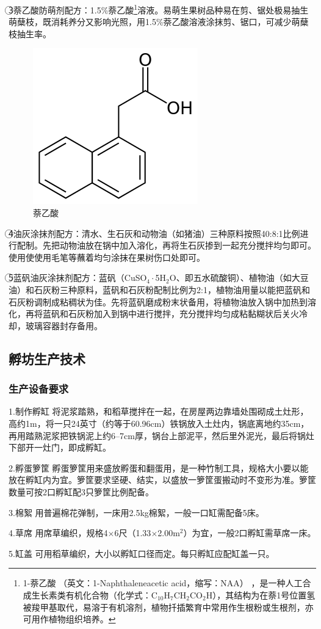 \documentclass{ctexbook}
\begin{document}
\textcircled{3}萘乙酸防萌剂配方：1.5\%萘乙酸\footnote{1-萘乙酸 （英文：1-Naphthaleneacetic acid，缩写：NAA） ，是一种人工合成生长素类有机化合物（化学式：C$_{10}$H$_7$CH$_2$CO$_2$H），其结构为在萘1号位置氢被羧甲基取代，易溶于有机溶剂，植物扦插繁育中常用作生根粉或生根剂，亦可用作植物组织培养。}溶液。易萌生果树品种易在剪、锯处极易抽生萌蘖枝，既消耗养分又影响光照，用1.5\%萘乙酸溶液涂抹剪、锯口，可减少萌蘖枝抽生率。
\begin{figure}
	\centering
	\includegraphics[width=0.2\linewidth]{nai}
	\caption{萘乙酸}
	\label{fig:nai}
\end{figure}
\textcircled{4}油灰涂抹剂配方：清水、生石灰和动物油（如猪油）三种原料按照40:8:1比例进行配制。先把动物油放在锅中加入溶化，再将生石灰掺到一起充分搅拌均匀即可。使用使使用毛笔等蘸着均匀涂抹在果树伤口处即可。

\textcircled{5}蓝矾油灰涂抹剂配方：蓝矾（CuSO$_{4}\cdot$5H$_2$O、即五水硫酸铜）、植物油（如大豆油）和石灰粉三种原料，蓝矾和石灰粉配制比例为2:1，植物油用量以能把蓝矾和石灰粉调制成粘稠状为佳。先将蓝矾磨成粉末状备用，将植物油放入锅中加热到溶化，再将蓝矾和石灰粉加入到锅中进行搅拌，充分搅拌均匀成粘黏糊状后关火冷却，玻璃容器封存备用。
\subsection{孵坊生产技术}
\subsubsection{生产设备要求}
1.制作孵缸 将泥浆踏熟，和稻草搅拌在一起，在房屋两边靠墙处围砌成土灶形，高约1m，将一只24英寸（约等于60.96cm）铁锅放入土灶内，锅底离地约35cm，再用踏熟泥浆把铁锅泥上约6--7cm厚，锅台上部泥平，然后里外泥光，最后将锅灶下部开一灶门，即成孵缸。

2.孵蛋箩筐 孵蛋箩筐用来盛放孵蛋和翻蛋用，是一种竹制工具，规格大小要以能放在孵缸内为宜。箩筐要求坚硬、结实，以盛放一箩筐蛋搬动时不变形为准。箩筐数量可按2口孵缸配3只箩筐比例配备。

3.棉絮 用普遍棉花弹制，一床用2.5kg棉絮，一般一口缸需配备5床。

4.草席 用席草编织，规格4$\times$6尺（1.33$\times$2.00m$^2$）为宜，一般2口孵缸需草席一床。

5.缸盖 可用稻草编织，大小以孵缸口径而定。每只孵缸应配缸盖一只。
\end{document}
